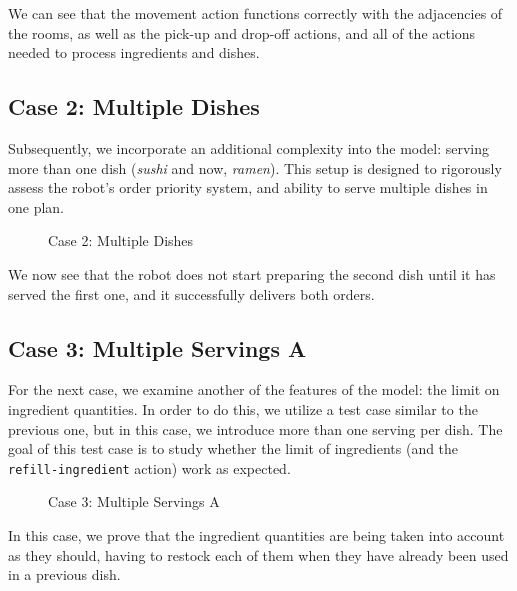 \documentclass{article}
\begin{document}
We can see that the movement action functions correctly with the adjacencies of the rooms, as well as the pick-up and drop-off actions, and all of the actions needed to process ingredients and dishes.

\subsection{Case 2: Multiple Dishes}

Subsequently, we incorporate an additional complexity into the model: serving more than one dish (\textit{sushi} and now, \textit{ramen}). This setup is designed to rigorously assess the robot's order priority system, and ability to serve multiple dishes in one plan.

\begin{figure}[H]
    \centering
    \caption{Case 2: Multiple Dishes}
    \label{fig:initial-state-dishes}
\end{figure}
\FloatBarrier

We now see that the robot does not start preparing the second dish until it has served the first one, and it successfully delivers both orders.

\subsection{Case 3: Multiple Servings A}

For the next case, we examine another of the features of the model: the limit on ingredient quantities. In order to do this, we utilize a test case similar to the previous one, but in this case, we introduce more than one serving per dish. The goal of this test case is to study whether the limit of ingredients (and the \texttt{refill-ingredient} action) work as expected.

\begin{figure}[H]
    \centering
    \caption{Case 3: Multiple Servings A}
    \label{fig:initial-state-servingsA}
\end{figure}
\FloatBarrier

In this case, we prove that the ingredient quantities are being taken into account as they should, having to restock each of them when they have already been used in a previous dish.
\end{document}
